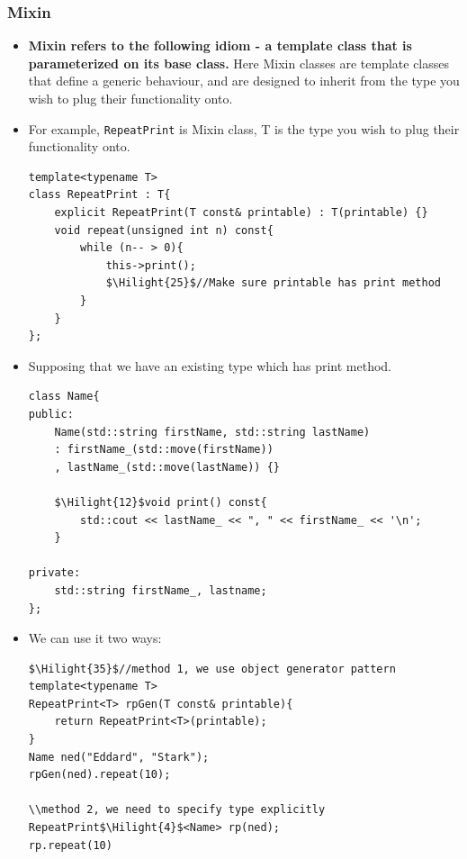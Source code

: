 \documentclass[a4paper,11pt,twoside]{book}
\newcommand{\Hilight}[1]{\makebox[0pt][l]{\color{yellow}\rule[-3pt]{#1em}{11pt}}}
\newcommand{\Hilight}[1]{}
\begin{document}
\subsubsection{Mixin}
\begin{itemize}
	\item \textbf{Mixin refers to the following idiom - a template class that is parameterized on its base class.} Here Mixin classes are template classes that define a generic behaviour, and are designed to inherit from the type you wish to plug their functionality onto.
	
	\item For example, \texttt{RepeatPrint} is Mixin class, T is the type you wish to plug their functionality onto.
\begin{lstlisting}
template<typename T>
class RepeatPrint : T{
	explicit RepeatPrint(T const& printable) : T(printable) {}
	void repeat(unsigned int n) const{
		while (n-- > 0){
			this->print(); 
			$\Hilight{25}$//Make sure printable has print method
		}
	}
};
\end{lstlisting}
	
	\item Supposing that we have an existing type which has print method.
\begin{lstlisting}
class Name{
public:
	Name(std::string firstName, std::string lastName)
	: firstName_(std::move(firstName))
	, lastName_(std::move(lastName)) {}
	
	$\Hilight{12}$void print() const{
		std::cout << lastName_ << ", " << firstName_ << '\n';
	}
	
private:
	std::string firstName_, lastname;
};
\end{lstlisting}
	
	\item We can use it two ways:
\begin{lstlisting}
$\Hilight{35}$//method 1, we use object generator pattern
template<typename T>
RepeatPrint<T> rpGen(T const& printable){
	return RepeatPrint<T>(printable);
}
Name ned("Eddard", "Stark");    
rpGen(ned).repeat(10);

\\method 2, we need to specify type explicitly
RepeatPrint$\Hilight{4}$<Name> rp(ned);
rp.repeat(10)
\end{lstlisting}

\end{itemize}
\end{document}
